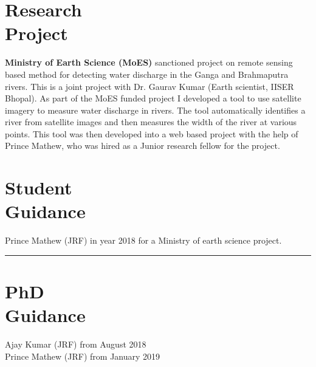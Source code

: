 \documentclass[margin]{res}
\begin{document}
\begin{resume}
\section{Research \\ Project}
{\bf Ministry of Earth Science (MoES)} sanctioned project on remote sensing based method for detecting water discharge in the Ganga and Brahmaputra rivers. This is a joint project with Dr. Gaurav Kumar (Earth scientist, IISER Bhopal). As part of the MoES funded project I developed a tool to use satellite imagery to measure water discharge in rivers. The tool automatically identifies a river from satellite images and then measures the width of the river at various points. This tool was then developed into a web based project with the help of Prince Mathew, who was hired as a Junior research fellow for the project.

\section{Student \\ Guidance}
Prince Mathew (JRF) in year 2018 for a Ministry of earth science project. \\
					\noindent\rule{13cm}{0.4pt} 
					
\section{PhD \\ Guidance}
Ajay Kumar (JRF) from August 2018 \\
Prince Mathew (JRF) from January 2019
 

\end{resume}
\end{document}

